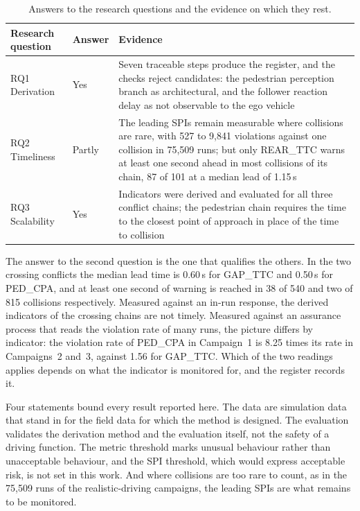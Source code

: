 \begin{table}[htbp]
    \centering
    \caption[Answers to the research questions]{Answers to the research questions and the evidence on which they rest.}
    \label{tab:rq_answers}
    \small
    \begin{tabular}{@{}l>{\raggedright\arraybackslash}p{1.6cm}>{\raggedright\arraybackslash}p{8.4cm}@{}}
        \toprule
        {\bfseries Research question} & {\bfseries Answer} & {\bfseries Evidence} \\
        \midrule
        RQ1 Derivation &
        Yes &
        Seven traceable steps produce the register, and the checks reject
        candidates: the pedestrian perception branch as architectural, and the
        follower reaction delay as not observable to the ego vehicle \\
        RQ2 Timeliness &
        Partly &
        The leading SPIs remain measurable where collisions are rare, with 527 to
        9,841 violations against one collision in 75,509 runs; but only REAR\_TTC
        warns at least one second ahead in most collisions of its chain, 87 of
        101 at a median lead of 1.15\,s \\
        RQ3 Scalability &
        Yes &
        Indicators were derived and evaluated for all three conflict chains; the
        pedestrian chain requires the time to the closest point of approach in
        place of the time to collision \\
        \bottomrule
    \end{tabular}
\end{table}

The answer to the second question is the one that qualifies the others. In the
two crossing conflicts the median lead time is 0.60\,s for GAP\_TTC and 0.50\,s
for PED\_CPA, and at least one second of warning is reached in 38 of 540 and two
of 815 collisions respectively. Measured against an in-run response, the derived
indicators of the crossing chains are not timely. Measured against an assurance
process that reads the violation rate of many runs, the picture differs by
indicator: the violation rate of PED\_CPA in Campaign~1 is 8.25 times its rate in
Campaigns~2 and~3, against 1.56 for GAP\_TTC. Which of the two readings applies
depends on what the indicator is monitored for, and the register records it.

Four statements bound every result reported here. The data are simulation data
that stand in for the field data for which the method is designed. The evaluation
validates the derivation method and the evaluation itself, not the safety of a
driving function. The metric threshold marks unusual behaviour rather than unacceptable
behaviour, and the SPI threshold, which would express acceptable risk, is not
set in this work. And where
collisions are too rare to count, as in the 75,509 runs of the realistic-driving
campaigns, the leading SPIs are what remains to be monitored.


